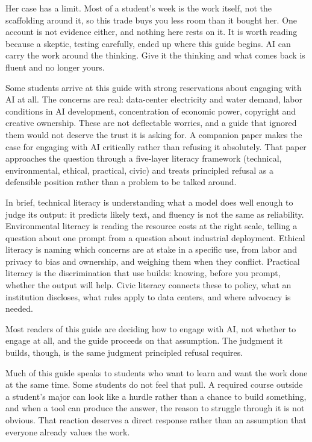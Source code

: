 \documentclass{SIAMbook2023}
\begin{document}
Her case has a limit. Most of a student's week is the work itself, not the scaffolding around it, so this trade buys you less room than it bought her. One account is not evidence either, and nothing here rests on it. It is worth reading because a skeptic, testing carefully, ended up where this guide begins. AI can carry the work around the thinking. Give it the thinking and what comes back is fluent and no longer yours.

Some students arrive at this guide with strong reservations about engaging with AI at all. The concerns are real: data-center electricity and water demand, labor conditions in AI development, concentration of economic power, copyright and creative ownership. These are not deflectable worries, and a guide that ignored them would not deserve the trust it is asking for. A companion paper \citep{hyman2026teaching} makes the case for engaging with AI critically rather than refusing it absolutely. That paper approaches the question through a five-layer literacy framework (technical, environmental, ethical, practical, civic) and treats principled refusal as a defensible position rather than a problem to be talked around.

In brief, technical literacy is understanding what a model does well enough to judge its output: it predicts likely text, and fluency is not the same as reliability. Environmental literacy is reading the resource costs at the right scale, telling a question about one prompt from a question about industrial deployment. Ethical literacy is naming which concerns are at stake in a specific use, from labor and privacy to bias and ownership, and weighing them when they conflict. Practical literacy is the discrimination that use builds: knowing, before you prompt, whether the output will help. Civic literacy connects these to policy, what an institution discloses, what rules apply to data centers, and where advocacy is needed.

Most readers of this guide are deciding how to engage with AI, not whether to engage at all, and the guide proceeds on that assumption. The judgment it builds, though, is the same judgment principled refusal requires.

Much of this guide speaks to students who want to learn and want the work done at the same time. Some students do not feel that pull. A required course outside a student's major can look like a hurdle rather than a chance to build something, and when a tool can produce the answer, the reason to struggle through it is not obvious. That reaction deserves a direct response rather than an assumption that everyone already values the work.
\end{document}
